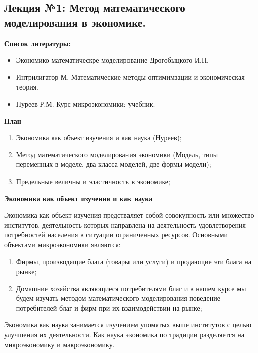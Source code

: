 \documentclass[12pt,a4paper]{article}
\author{GH-TIMe}
\begin{document}
\begin{center}
\section*{Лекция №1: Метод математического моделирования в экономике.}
\end{center}

\textbf{Список литературы:}
\begin{itemize}
\item Экономико-математическре моделирование Дрогобыцкого И.Н.
\item Интрилигатор М. Математические методы оптимимзации и экономическая теория.
\item Нуреев Р.М. Курс микроэкономики: учебник.
\end{itemize}

\begin{center}
\textbf{План}
\end{center}

\begin{enumerate}
\item Экономика как объект изучения и как наука (Нуреев);
\item Метод математического моделирования экономики (Модель, типы переменных в моделе, два класса моделей, две формы модели);
\item Предельные величны и эластичность в экономике;
\end{enumerate}

\begin{center}
\textbf{Экономика как объект изучения и как наука}
\end{center}

Экономика как объект изучения предстваляет собой совокупность или множество институтов, деятельность которых направлена на деятельность удовлетворения потребностей населения в ситуации ограниченных ресурсов. Основными объектами микроэкономики являются:
\begin{enumerate}
\item Фирмы, производящие блага (товары или услуги) и продающие эти блага на рынке;
\item Домашние хозяйства являющиеся потребителями благ и в нашем курсе мы будем изучать методом математического моделирования поведение потребителей благ и фирм при их взаимодействии на рынке;
\end{enumerate}

Экономика как наука занимается изучением упомятых выше институтов с целью улучшения их деятельности. Как наука экономика по традиции разделяется на микроэкономику и макроэкономику.
\end{document}
